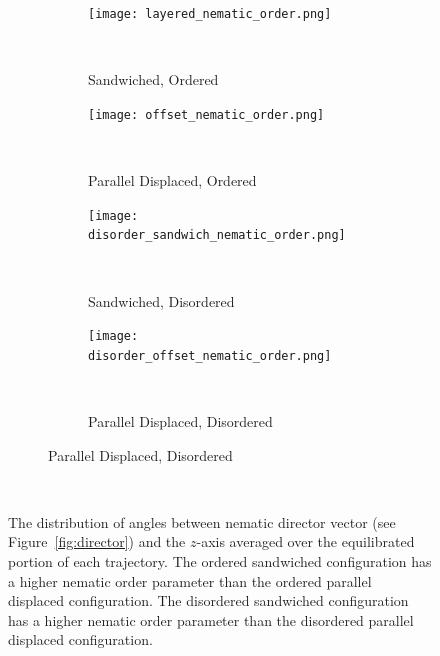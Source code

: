 \documentclass{article}
\begin{document}
  \begin{figure}[!htb]
  \begin{subfigure}{\linewidth}
        \centering
        \begin{subfigure}{0.45\linewidth}
                \centering
                \texttt{[image: layered\_nematic\_order.png]}
                \caption{Sandwiched, Ordered}~\label{fig:sandwich_nematic}
        \end{subfigure}%
        \begin{subfigure}{0.45\linewidth}
                \centering
                \texttt{[image: offset\_nematic\_order.png]}
                \caption{Parallel Displaced, Ordered}~\label{fig:offset_nematic}
        \end{subfigure}
        \begin{subfigure}{0.45\linewidth}
                \centering
                \texttt{[image: disorder\_sandwich\_nematic\_order.png]}
                \caption{Sandwiched, Disordered}~\label{fig:disorder_sandwich_nematic}
        \end{subfigure}%
        \begin{subfigure}{0.45\linewidth}
                \centering
                \texttt{[image: disorder\_offset\_nematic\_order.png]}
                \caption{Parallel Displaced, Disordered}~\label{fig:disorder_offset_nematic}
        \end{subfigure}
  \end{subfigure}
  \caption{The distribution of angles between nematic director vector (see
	  Figure~\ref{fig:director}) and the $z$-axis averaged over the equilibrated portion
	  of each trajectory. The ordered sandwiched configuration has a higher nematic order
	  parameter than the ordered parallel displaced configuration. The disordered
	  sandwiched configuration has a higher nematic order parameter than the 
	  disordered parallel displaced configuration.}~\label{fig:nematic_distribution}
  \end{figure}
\end{document}
